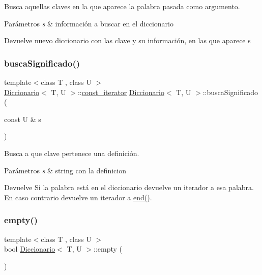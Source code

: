 Busca aquellas claves en la que aparece la palabra pasada como argumento. 


\begin{DoxyParams}{Parámetros}
{\em s} & información a buscar en el diccionario \\
\hline
\end{DoxyParams}
\begin{DoxyReturn}{Devuelve}
nuevo diccionario con las clave y su información, en las que aparece s 
\end{DoxyReturn}
\mbox{\label{classDiccionario_ab64193a99413ad5054992943560b3ead}} 
\subsubsection{\texorpdfstring{busca\+Significado()}{buscaSignificado()}}
{\footnotesize\ttfamily template$<$class T , class U $>$ \\
\hyperlink{classDiccionario}{Diccionario}$<$ T, U $>$\+::\hyperlink{classDiccionario_1_1const__iterator}{const\+\_\+iterator} \hyperlink{classDiccionario}{Diccionario}$<$ T, U $>$\+::busca\+Significado (\begin{DoxyParamCaption}\item[{const U \&}]{s }\end{DoxyParamCaption})}



Busca a que clave pertenece una definición. 


\begin{DoxyParams}{Parámetros}
{\em s} & string con la definicion \\
\hline
\end{DoxyParams}
\begin{DoxyReturn}{Devuelve}
Si la palabra está en el diccionario devuelve un iterador a esa palabra. En caso contrario devuelve un iterador a \hyperlink{classDiccionario_aa6f9f59a1f6478b7ff61369132fb4061}{end()}. 
\end{DoxyReturn}
\mbox{\label{classDiccionario_ae7215bf0462b43065fef6baadd484c5b}} 
\subsubsection{\texorpdfstring{empty()}{empty()}}
{\footnotesize\ttfamily template$<$class T , class U $>$ \\
bool \hyperlink{classDiccionario}{Diccionario}$<$ T, U $>$\+::empty (\begin{DoxyParamCaption}{ }\end{DoxyParamCaption})}



